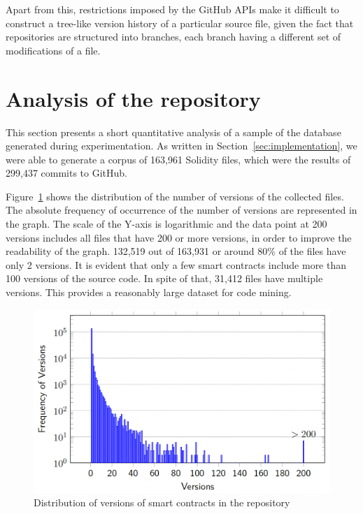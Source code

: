 \documentclass[10pt,conference]{IEEEtran}
\begin{document}
	Apart from this, restrictions imposed by the GitHub APIs make it difficult to construct a tree-like version history of a particular source file, given the fact that repositories are structured into branches, each branch having a different set of modifications of a file. 
	
	\section{Analysis of the repository}
	This section presents a short quantitative analysis of a sample of the database generated during experimentation. As written in Section~\ref{sec:implementation}, we were able to generate a corpus of 163,961 Solidity files, which were the results of 299,437 commits to GitHub.
	
	Figure~\ref{fig:versions} shows the distribution of the number of versions of the collected files. The absolute frequency of occurrence of the number of versions are represented in the graph. The scale of the Y-axis is logarithmic and the data point at 200 versions includes all files that have 200 or more versions, in order to improve the readability of the graph. 132,519 out of 163,931 or around 80\% of the files have only 2 versions. It is evident that only a few smart contracts include more than 100 versions of the source code. In spite of that, 31,412 files have multiple versions. This provides a reasonably large dataset for code mining.
	
	\begin{figure}[!h]
		\centering
		\includegraphics[scale=0.3]{distr_versions_contracts.png}
		\caption{Distribution of versions of smart contracts in the repository}
		\label{fig:versions}
	\end{figure}
	
\end{document}

